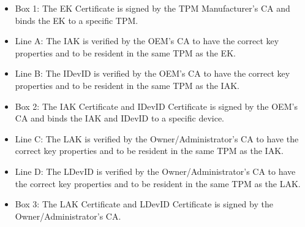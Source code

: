 \begin{itemize}
  \item Box 1: The EK Certificate is signed by the TPM Manufacturer's CA and binds the EK to a specific TPM.
  \item Line A: The IAK is verified by the OEM's CA to have the correct key properties and to be resident in the same TPM as the EK.
  \item Line B: The IDevID is verified by the OEM's CA to have the correct key properties and to be resident in the same TPM as the IAK.
  \item Box 2: The IAK Certificate and IDevID Certificate is signed by the OEM's CA and binds the IAK and IDevID to a specific device.
  \item Line C: The LAK is verified by the Owner/Administrator's CA to have the correct key properties and to be resident in the same TPM as the IAK.
  \item Line D: The LDevID is verified by the Owner/Administrator's CA to have the correct key properties and to be resident in the same TPM as the LAK.
  \item Box 3: The LAK Certificate and LDevID Certificate is signed by the Owner/Administrator's CA.
\end{itemize}

